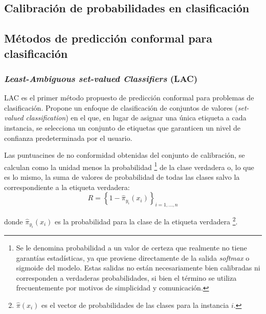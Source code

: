 \subsection{Calibración de probabilidades en clasificación}



\subsection{Métodos de predicción conformal para clasificación}

\subsubsection{\textit{Least-Ambiguous set-valued Classifiers} (LAC)}

LAC \cite{sadinle2019} es el primer método propuesto de predicción conformal para problemas de clasificación. 
Propone un enfoque de clasificación de conjuntos de valores (\textit{set-valued classification}) en el que, 
en lugar de asignar una única etiqueta a cada instancia, se selecciona un conjunto de etiquetas que 
garanticen un nivel de confianza predeterminada por el usuario.

Las puntuacines de no conformidad obtenidas del conjunto de calibración, se calculan como la unidad menos la 
probabilidad
\footnote{
    Se le denomina probabilidad a un valor de certeza que realmente no tiene garantías estadísticas,
    ya que proviene directamente de la salida \textit{softmax} o sigmoide del modelo. Estas salidas no 
    están necesariamente bien calibradas ni corresponden a verdaderas probabilidades, si bien el término 
    se utiliza frecuentemente por motivos de simplicidad y comunicación.
}
de la clase verdadera o, lo que es lo mismo, la suma de valores de probabilidad de todas las clases salvo
la correspondiente a la etiqueta verdadera:
$$
R = \left\{ 1 - \hat{\pi}_{y_i}(x_i) \right\}_{i=1,...,n}
$$

donde $\hat{\pi}_{y_i}(x_i)$ es la probabilidad para la clase de la etiqueta verdadera
\footnote{
    $\hat{\pi}(x_i)$ es el vector de probabilidades de las clases para la instancia $i$.
}.


